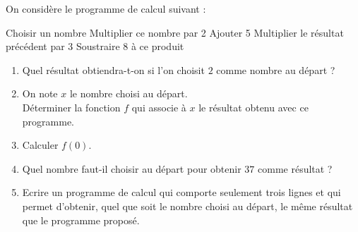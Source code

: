 
%
On considère le programme de calcul suivant :
\begin{code}
Choisir un nombre
Multiplier ce nombre par 2
Ajouter 5
Multiplier le résultat précédent par 3
Soustraire 8 à ce produit
\end{code}
\begin{enumerate}
     \item
     Quel résultat obtiendra-t-on si l'on choisit $2$ comme nombre au départ ?
     \item
     On note $x$ le nombre choisi au départ.
\\
     Déterminer la fonction $f$ qui associe à $x$ le résultat obtenu avec ce programme.
     \item
     Calculer $f\left(0\right)$.
     \item
     Quel nombre faut-il choisir au départ pour obtenir $37$ comme résultat ?
     \item
     Ecrire un programme de calcul qui comporte seulement trois lignes et qui permet d'obtenir, quel que soit le nombre choisi au départ, le même résultat que le programme proposé.
\end{enumerate}
